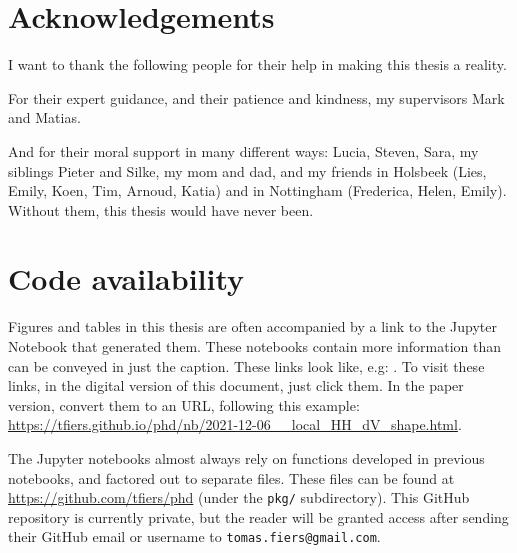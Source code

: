 

\chapter*{Acknowledgements}

I want to thank the following people for their help in making this thesis a reality.

For their expert guidance, and their patience and kindness, my supervisors Mark and Matias.

And for their moral support in many different ways:
Lucia, Steven, Sara, my siblings Pieter and Silke, my mom and dad, and my friends in Holsbeek (Lies, Emily, Koen, Tim, Arnoud, Katia) and in Nottingham (Frederica, Helen, Emily).
Without them, this thesis would have never been.


\chapter*{Code availability}

Figures and tables in this thesis are often accompanied by a link to the Jupyter Notebook that generated them. These notebooks contain more information than can be conveyed in just the caption. These links look like, e.g:
.
To visit these links, in the digital version of this document, just click them. In the paper version, convert them to an URL, following this example: {\small \url{https://tfiers.github.io/phd/nb/2021-12-06__local_HH_dV_shape.html}}.

The Jupyter notebooks almost always rely on functions developed in previous notebooks, and factored out to separate files. These files can be found at \url{https://github.com/tfiers/phd} (under the \texttt{pkg/} subdirectory). This GitHub repository is currently private, but the reader will be granted access after sending their GitHub email or username to \texttt{tomas.fiers@gmail.com}.
